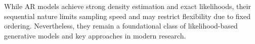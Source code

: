 





While AR models achieve strong density estimation and exact likelihoods, their sequential nature limits sampling speed and may restrict flexibility due to fixed ordering. Nevertheless, they remain a foundational class of likelihood-based generative models and key approaches in modern research. 


